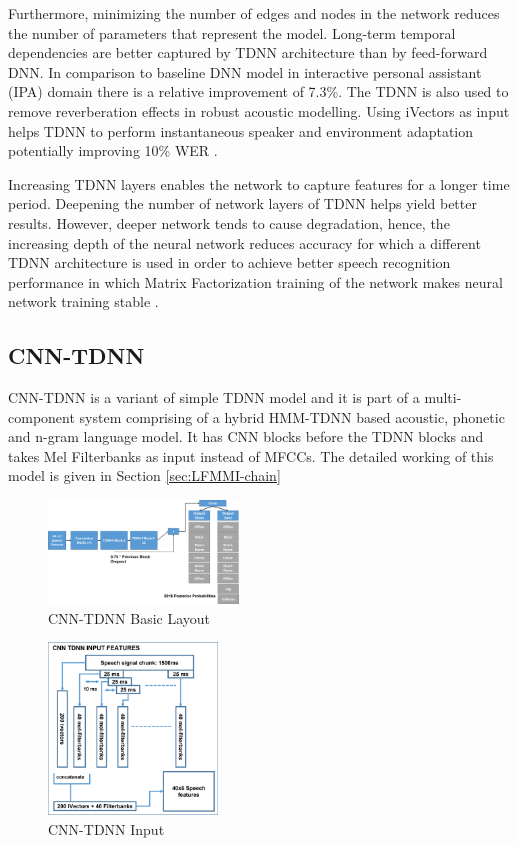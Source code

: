 Furthermore, minimizing the number of edges and nodes in the network reduces the number of parameters that represent the model. Long-term temporal dependencies are better captured by TDNN architecture than by feed-forward DNN. In comparison to baseline DNN model in interactive personal assistant (IPA) domain there is a relative improvement of 7.3\%.  The TDNN is also used to remove reverberation effects in robust acoustic modelling. Using iVectors as input helps TDNN to perform instantaneous speaker and environment adaptation potentially improving 10\% WER \cite{yeh_taiwanese_2020}.

Increasing TDNN layers enables the network to capture features for a longer time period. Deepening the number of network layers of TDNN helps yield better results. However, deeper network tends to cause degradation, hence, the increasing depth of the neural network reduces accuracy for which a different TDNN architecture is used  in order to achieve better speech recognition performance in which Matrix Factorization training of the network makes neural network training stable \cite{povey_semi-orthogonal_2018}.

\subsection{CNN-TDNN}

CNN-TDNN \cite{ghahremani_acoustic_2016} is a variant of simple TDNN model and it is part of a multi-component system comprising of a hybrid HMM-TDNN based acoustic, phonetic and n-gram language model. It has CNN blocks before the TDNN blocks and takes Mel Filterbanks as input instead of MFCCs. The detailed working of this model is given in Section \ref{sec:LFMMI-chain}

\begin{figure}[htb]
    \centering
    \includegraphics[width=0.45\textwidth]{img/CNNTDNN2.png}
    \caption{CNN-TDNN Basic Layout}
    \label{fig:CNNTDNN-Layout}
\end{figure}

\begin{figure}[h!]
    \centering
    \includegraphics[width=0.4\textwidth]{img/CNNTDNN-INPUT.png}
    \caption{CNN-TDNN Input}
    \label{fig:CNN-TDNN-INPUT}
\end{figure}



